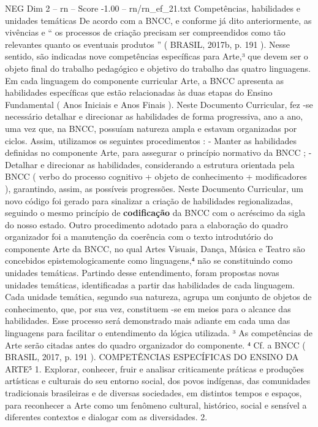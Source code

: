 \begin{textsample}{NEG Dim 2 – rn – Score -1.00 – rn/rn\_ef\_21.txt}  \label{ex:f2_neg_043}
Competências, habilidades e unidades temáticas De acordo com a BNCC, e conforme já dito anteriormente, as vivências e “ os processos de criação precisam ser compreendidos como tão relevantes quanto os eventuais produtos ” ( BRASIL, 2017b, p. 191 ).
Nesse sentido, são indicadas nove competências específicas para Arte,³ que devem ser o objeto final do trabalho pedagógico e objetivo do trabalho das quatro linguagens.
Em cada linguagem do componente curricular Arte, a BNCC apresenta as habilidades específicas que estão relacionadas às duas etapas do Ensino Fundamental ( Anos Iniciais e Anos Finais ).
Neste Documento Curricular, fez -se necessário detalhar e direcionar as habilidades de forma progressiva, ano a ano, uma vez que, na BNCC, possuíam natureza ampla e estavam organizadas por ciclos.
Assim, utilizamos os seguintes procedimentos : - Manter as habilidades definidas no componente Arte, para assegurar o princípio normativo da BNCC ; - Detalhar e direcionar as habilidades, considerando a estrutura orientada pela BNCC ( verbo do processo cognitivo + objeto de conhecimento + modificadores ), garantindo, assim, as possíveis progressões.
Neste Documento Curricular, um novo código foi gerado para sinalizar a criação de habilidades regionalizadas, seguindo o mesmo princípio de \textbf{codificação} da BNCC com o acréscimo da sigla do nosso estado.
Outro procedimento adotado para a elaboração do quadro organizador foi a manutenção da coerência com o texto introdutório do componente Arte da BNCC, no qual Artes Visuais, Dança, Música e Teatro são concebidos epistemologicamente como linguagens,⁴ não se constituindo como unidades temáticas.
Partindo desse entendimento, foram propostas novas unidades temáticas, identificadas a partir das habilidades de cada linguagem.
Cada unidade temática, segundo sua natureza, agrupa um conjunto de objetos de conhecimento, que, por sua vez, constituem -se em meios para o alcance das habilidades.
Esse processo será demonstrado mais adiante em cada uma das linguagens para facilitar o entendimento da lógica utilizada. ³ As competências de Arte serão citadas antes do quadro organizador do componente. ⁴ Cf. a BNCC ( BRASIL, 2017, p. 191 ).
COMPETÊNCIAS ESPECÍFICAS DO ENSINO DA ARTE⁵ 1.
Explorar, conhecer, fruir e analisar criticamente práticas e produções artísticas e culturais do seu entorno social, dos povos indígenas, das comunidades tradicionais brasileiras e de diversas sociedades, em distintos tempos e espaços, para reconhecer a Arte como um fenômeno cultural, histórico, social e sensível a diferentes contextos e dialogar com as diversidades. 2.

\end{textsample}
